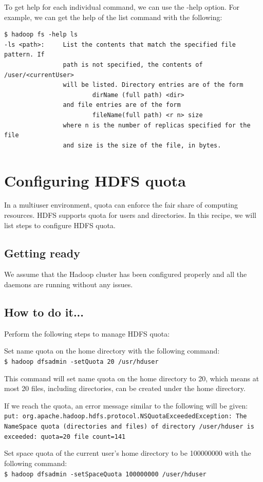 To get help for each individual command, we can use the -help option. For example, we can get the help of the list command with the following:
\begin{verbatim}
$ hadoop fs -help ls
-ls <path>:     List the contents that match the specified file pattern. If
                path is not specified, the contents of /user/<currentUser>
                will be listed. Directory entries are of the form
                        dirName (full path) <dir>
                and file entries are of the form
                        fileName(full path) <r n> size
                where n is the number of replicas specified for the file
                and size is the size of the file, in bytes.
\end{verbatim}
\section{Configuring HDFS quota}
In a multiuser environment, quota can enforce the fair share of computing resources. HDFS supports quota for users and directories. In this recipe, we will list steps to configure HDFS quota.

\subsection*{Getting ready}
We assume that the Hadoop cluster has been configured properly and all the daemons are running without any issues.

\subsection*{How to do it...}
Perform the following steps to manage HDFS quota:

Set name quota on the home directory with the following command: \\
\verb|$ hadoop dfsadmin -setQuota 20 /usr/hduser|

This command will set name quota on the home directory to 20, which means at most 20 files, including directories, can be created under the home directory. 

If we reach the quota, an error message similar to the following will be given: \\
\verb|put: org.apache.hadoop.hdfs.protocol.NSQuotaExceededException: The NameSpace quota (directories and files) of directory /user/hduser is exceeded: quota=20 file count=141|

Set space quota of the current user's home directory to be 100000000 with the following command: \\
\verb|$ hadoop dfsadmin -setSpaceQuota 100000000 /user/hduser|

